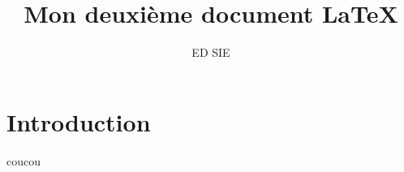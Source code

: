 \documentclass[10pt,a4paper]{article}
\title{Mon deuxième document \LaTeX}
\author{ED SIE}
\begin{document}
\maketitle
\tableofcontents

\section{Introduction}
coucou
\end{document}
